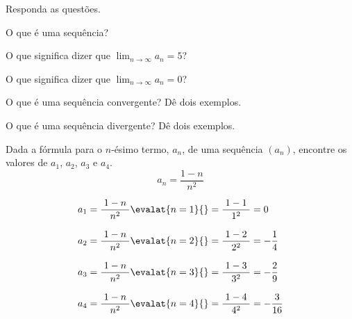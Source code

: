 \begin{exercises}

\begin{exercise}
  Responda as questões.
  \begin{alphalist}
    \item O que é uma sequência?
    \item O que significa dizer que \(\lim_{n\to\infty} a_n = 5 \)?
    \item O que significa dizer que \(\lim_{n\to\infty} a_n = 0 \)?
    \item O que é uma sequência convergente? Dê dois exemplos.
    \item O que é uma sequência divergente? Dê dois exemplos.
  \end{alphalist}
\end{exercise}

\begin{exercise}
Dada a fórmula para o $n$-ésimo termo, $a_n$, de uma sequência $(a_n)$,
encontre os valores de $a_1$, $a_2$, $a_3$ e $a_4$.
\[
  a_n = \frac{1-n}{n^2}
\]
\begin{answer}
\begin{align*}
  a_1 & = \dfrac{\;1-n\;}{n^2}\evalat{n=1}{} = \dfrac{\;1-1\;}{1^2} = 0              \\[3mm]
  a_2 & = \dfrac{\;1-n\;}{n^2}\evalat{n=2}{} = \dfrac{\;1-2\;}{2^2} = -\dfrac{1}{4}  \\[3mm]
  a_3 & = \dfrac{\;1-n\;}{n^2}\evalat{n=3}{} = \dfrac{\;1-3\;}{3^2} = -\dfrac{2}{9}  \\[3mm]
  a_4 & = \dfrac{\;1-n\;}{n^2}\evalat{n=4}{} = \dfrac{\;1-4\;}{4^2} = -\dfrac{3}{16}
\end{align*}
\end{answer}
\end{exercise}


\end{exercises}
